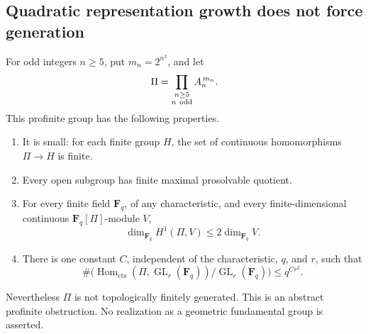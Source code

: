 \subsection{Quadratic representation growth does not force generation}

\begin{example}
\label{D:quadratic-growth-alternating-obstruction}
For odd integers \(n\geq5\), put \(m_n=2^{n^2}\), and let
\[
 \Pi=\prod_{\substack{n\geq5\\n\ {\rm odd}}} A_n^{\,m_n}.
\]
This profinite group has the following properties.
\begin{enumerate}
\item It is small: for each finite group \(H\), the set of continuous
homomorphisms \(\Pi\to H\) is finite.
\item Every open subgroup has finite maximal prosolvable quotient.
\item For every finite field \(\mathbf F_q\), of any characteristic,
and every finite-dimensional continuous \(\mathbf F_q[\Pi]\)-module \(V\),
\[
 \dim_{\mathbf F_q}H^1(\Pi,V)\leq2\dim_{\mathbf F_q}V.
 \tag{A1}
\]
\item There is one constant \(C\), independent of the characteristic,
\(q\), and \(r\), such that
\[
 \#\bigl(
 \operatorname{Hom}_{\mathrm{cts}}(\Pi,\operatorname{GL}_r(\mathbf F_q))
             /\operatorname{GL}_r(\mathbf F_q)\bigr)
       \leq q^{Cr^2}.
 \tag{A2}
\]
\end{enumerate}
Nevertheless \(\Pi\) is not topologically finitely generated.
This is an abstract profinite obstruction. No realization as a
geometric fundamental group is asserted.
\end{example}

